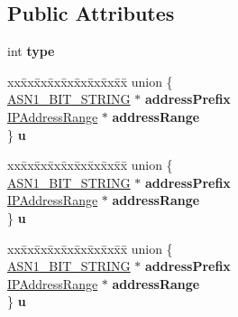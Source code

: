 \subsection*{Public Attributes}
\begin{DoxyCompactItemize}
\item 
\mbox{\label{structIPAddressOrRange__st_aa9221b14bda47976f0591fe65a3d90aa}} 
int {\bfseries type}
\item 
\mbox{\label{structIPAddressOrRange__st_aca5179848ce18bc9f448c2d389f8dd30}} 
\begin{tabbing}
xx\=xx\=xx\=xx\=xx\=xx\=xx\=xx\=xx\=\kill
union \{\\
\>\hyperlink{structasn1__string__st}{ASN1\_BIT\_STRING} $\ast$ {\bfseries addressPrefix}\\
\>\hyperlink{structIPAddressRange__st}{IPAddressRange} $\ast$ {\bfseries addressRange}\\
\} {\bfseries u}\\

\end{tabbing}\item 
\mbox{\label{structIPAddressOrRange__st_a8ccea12e7f03f2728d93e43cee44ed9f}} 
\begin{tabbing}
xx\=xx\=xx\=xx\=xx\=xx\=xx\=xx\=xx\=\kill
union \{\\
\>\hyperlink{structasn1__string__st}{ASN1\_BIT\_STRING} $\ast$ {\bfseries addressPrefix}\\
\>\hyperlink{structIPAddressRange__st}{IPAddressRange} $\ast$ {\bfseries addressRange}\\
\} {\bfseries u}\\

\end{tabbing}\item 
\mbox{\label{structIPAddressOrRange__st_a17356abd5de150ba2d8b69965edd1ca2}} 
\begin{tabbing}
xx\=xx\=xx\=xx\=xx\=xx\=xx\=xx\=xx\=\kill
union \{\\
\>\hyperlink{structasn1__string__st}{ASN1\_BIT\_STRING} $\ast$ {\bfseries addressPrefix}\\
\>\hyperlink{structIPAddressRange__st}{IPAddressRange} $\ast$ {\bfseries addressRange}\\
\} {\bfseries u}\\


\end{tabbing}
\end{DoxyCompactItemize}
